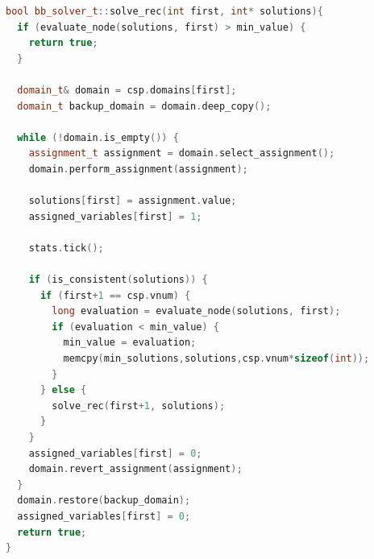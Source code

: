 \documentclass[10pt, a4paper]{article}
\begin{document}
\begin{lstlisting}[language=C++, caption=Funzione \texttt{solve\_rec} per la risoluzione \textit{branch and bound}, label=lst:bb_solve_rec]
bool bb_solver_t::solve_rec(int first, int* solutions){
  if (evaluate_node(solutions, first) > min_value) {
    return true;
  }
 
  domain_t& domain = csp.domains[first];
  domain_t backup_domain = domain.deep_copy();

  while (!domain.is_empty()) {
    assignment_t assignment = domain.select_assignment();
    domain.perform_assignment(assignment);

    solutions[first] = assignment.value;
    assigned_variables[first] = 1;

    stats.tick();

    if (is_consistent(solutions)) {
      if (first+1 == csp.vnum) {
        long evaluation = evaluate_node(solutions, first);
        if (evaluation < min_value) {
          min_value = evaluation;
          memcpy(min_solutions,solutions,csp.vnum*sizeof(int));
        }
      } else { 
        solve_rec(first+1, solutions);
      }
    }
    assigned_variables[first] = 0;
    domain.revert_assignment(assignment);
  }
  domain.restore(backup_domain);
  assigned_variables[first] = 0;
  return true;
}
\end{lstlisting}
\end{document}
